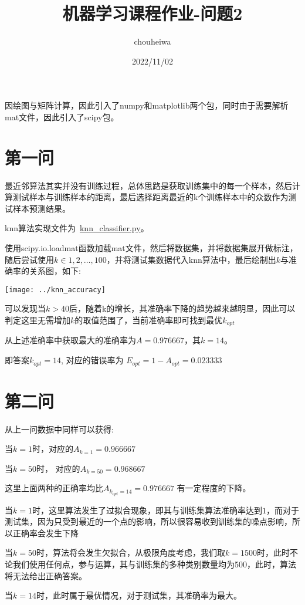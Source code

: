 \documentclass[UTF8]{article} %
\title{机器学习课程作业-问题2}
\author{chouheiwa}
\date{2022/11/02}
\begin{document}
    \maketitle
    \tableofcontents
    因绘图与矩阵计算，因此引入了numpy和matplotlib两个包，同时由于需要解析mat文件，因此引入了scipy包。


    \section{第一问}
    最近邻算法其实并没有训练过程，总体思路是获取训练集中的每一个样本，然后计算测试样本与训练样本的距离，最后选择距离最近的k个训练样本中的众数作为测试样本预测结果。

    knn算法实现文件为~\href{run:knn_classifier.py}{knn\_classifier.py}。

    使用scipy.io.loadmat函数加载mat文件，然后将数据集，并将数据集展开做标注，随后尝试使用$k \in 1 , 2,\dots, 100$，并将测试集数据代入knn算法中，最后绘制出$k$与准确率的关系图，如下:

    \texttt{[image: ../knn\_accuracy]}

    可以发现当$k > 40$后，随着k的增长，其准确率下降的趋势越来越明显，因此可以判定这里无需增加$k$的取值范围了，当前准确率即可找到最优$k_{opt}$

    从上述准确率中获取最大的准确率为$A = 0.976667$，其$k = 14$。

    即答案$k_{opt} = 14$, 对应的错误率为 $E_{opt} = 1 - A_{opt} = 0.023333$


    \section{第二问}

    从上一问数据中同样可以获得:

    当$k = 1$时，对应的$A_{k=1} = 0.966667$

    当$k = 50$时， 对应的$A_{k=50} = 0.968667$

    这里上面两种的正确率均比$A_{k_{opt} = 14} = 0.976667$ 有一定程度的下降。

    当$k = 1$时，这里算法发生了过拟合现象，即其与训练集算法准确率达到$1$，而对于测试集，因为只受到最近的一个点的影响，所以很容易收到训练集的噪点影响，所以正确率会发生下降

    当$k = 50$时，算法将会发生欠拟合，从极限角度考虑，我们取$k = 1500$时，此时不论我们使用任何点，参与运算，其与训练集的多种类别数量均为500，此时，算法将无法给出正确答案。

    当$k = 14$时，此时属于最优情况，对于测试集，其准确率为最大。
\end{document}
